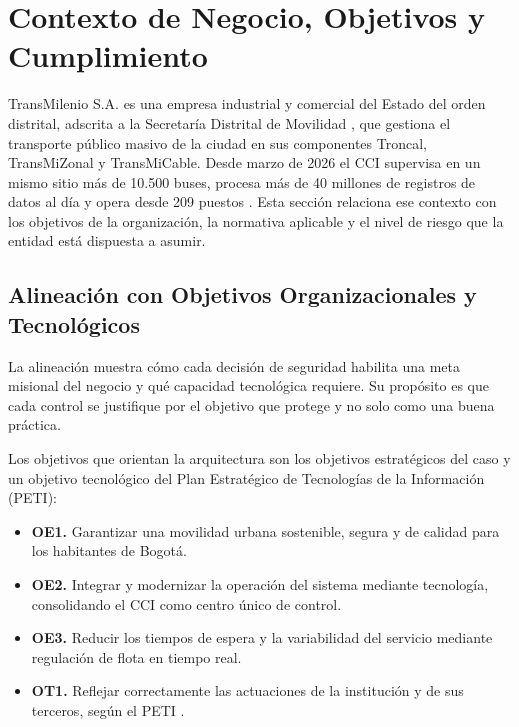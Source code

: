 \section{Contexto de Negocio, Objetivos y Cumplimiento}

TransMilenio S.A. es una empresa industrial y comercial del Estado del orden distrital, adscrita a la Secretaría Distrital de Movilidad \parencite{transmilenio2025pesi}, que gestiona el transporte público masivo de la ciudad en sus componentes Troncal, TransMiZonal y TransMiCable. Desde marzo de 2026 el CCI supervisa en un mismo sitio más de 10.500 buses, procesa más de 40 millones de registros de datos al día y opera desde 209 puestos \parencite{alcaldia2026cci,transmilenio2026cci}. Esta sección relaciona ese contexto con los objetivos de la organización, la normativa aplicable y el nivel de riesgo que la entidad está dispuesta a asumir.

\subsection{Alineación con Objetivos Organizacionales y Tecnológicos}

La alineación muestra cómo cada decisión de seguridad habilita una meta misional del negocio y qué capacidad tecnológica requiere. Su propósito es que cada control se justifique por el objetivo que protege y no solo como una buena práctica.

Los objetivos que orientan la arquitectura son los objetivos estratégicos del caso y un objetivo tecnológico del Plan Estratégico de Tecnologías de la Información (PETI):

\begin{itemize}
  \item \textbf{OE1.} Garantizar una movilidad urbana sostenible, segura y de calidad para los habitantes de Bogotá.
  \item \textbf{OE2.} Integrar y modernizar la operación del sistema mediante tecnología, consolidando el CCI como centro único de control.
  \item \textbf{OE3.} Reducir los tiempos de espera y la variabilidad del servicio mediante regulación de flota en tiempo real.
  \item \textbf{OT1.} Reflejar correctamente las actuaciones de la institución y de sus terceros, según el PETI \parencite{transmilenio2020peti}.
\end{itemize}

